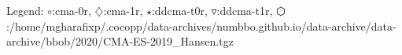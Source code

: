 Legend: {\color{NavyBlue}$\circ$}:cma-0r, {\color{Magenta}$\diamondsuit$}:cma-1r, {\color{Orange}$\star$}:ddcma-t0r, {\color{CornflowerBlue}$\triangledown$}:ddcma-t1r, {\color{red}$\varhexagon$}:/home/mgharafixp/.cocopp/data-archives/numbbo.github.io/data-archive/data-archive/bbob/2020/CMA-ES-2019\_Hansen.tgz